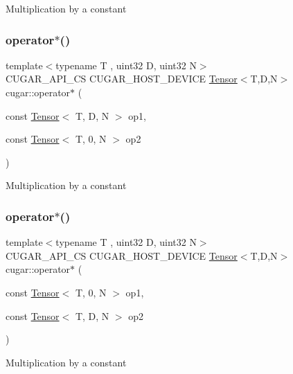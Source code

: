 Multiplication by a constant \mbox{\label{namespacecugar_ae8c09c99638658fa703697fba1fca018}} 
\subsubsection{\texorpdfstring{operator$\ast$()}{operator*()}\hspace{0.1cm}{\footnotesize\ttfamily [5/6]}}
{\footnotesize\ttfamily template$<$typename T , uint32 D, uint32 N$>$ \\
C\+U\+G\+A\+R\+\_\+\+A\+P\+I\+\_\+\+CS C\+U\+G\+A\+R\+\_\+\+H\+O\+S\+T\+\_\+\+D\+E\+V\+I\+CE \hyperlink{structcugar_1_1_tensor}{Tensor}$<$T,D,N$>$ cugar\+::operator$\ast$ (\begin{DoxyParamCaption}\item[{const \hyperlink{structcugar_1_1_tensor}{Tensor}$<$ T, D, N $>$}]{op1,  }\item[{const \hyperlink{structcugar_1_1_tensor}{Tensor}$<$ T, 0, N $>$}]{op2 }\end{DoxyParamCaption})}

Multiplication by a constant \mbox{\label{namespacecugar_aff946519c06f0697d939f1b64ff2e9c3}} 
\subsubsection{\texorpdfstring{operator$\ast$()}{operator*()}\hspace{0.1cm}{\footnotesize\ttfamily [6/6]}}
{\footnotesize\ttfamily template$<$typename T , uint32 D, uint32 N$>$ \\
C\+U\+G\+A\+R\+\_\+\+A\+P\+I\+\_\+\+CS C\+U\+G\+A\+R\+\_\+\+H\+O\+S\+T\+\_\+\+D\+E\+V\+I\+CE \hyperlink{structcugar_1_1_tensor}{Tensor}$<$T,D,N$>$ cugar\+::operator$\ast$ (\begin{DoxyParamCaption}\item[{const \hyperlink{structcugar_1_1_tensor}{Tensor}$<$ T, 0, N $>$}]{op1,  }\item[{const \hyperlink{structcugar_1_1_tensor}{Tensor}$<$ T, D, N $>$}]{op2 }\end{DoxyParamCaption})}

Multiplication by a constant \mbox{\label{namespacecugar_ad00d874cefcf34cd39c694ae936cf052}} 
